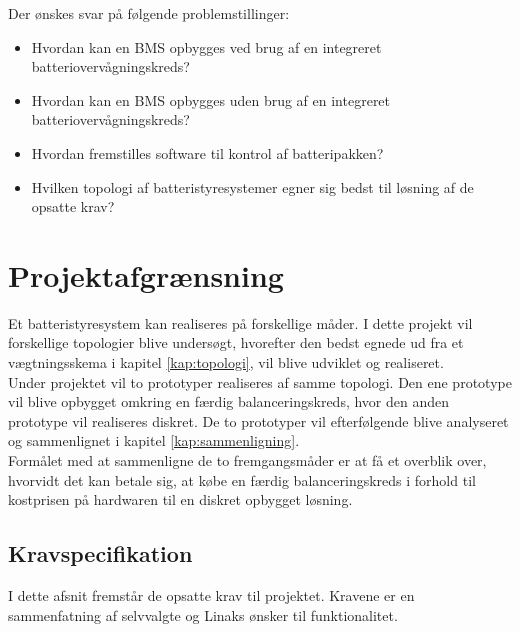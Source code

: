Der ønskes svar på følgende problemstillinger: 

\begin{itemize}[noitemsep]
	\item Hvordan kan en BMS opbygges ved brug af en integreret batteriovervågningskreds?
	\item Hvordan kan en BMS opbygges uden brug af en integreret batteriovervågningskreds? 
	\item Hvordan fremstilles software til kontrol af batteripakken?
	\item Hvilken topologi af batteristyresystemer egner sig bedst til løsning af de opsatte krav?
\end{itemize}

\section{Projektafgrænsning}
Et batteristyresystem kan realiseres på forskellige måder. I dette projekt vil forskellige topologier blive undersøgt, hvorefter den bedst egnede ud fra et vægtningsskema i kapitel \ref{kap:topologi}, vil blive udviklet og realiseret. 
\\

Under projektet vil to prototyper realiseres af samme topologi. Den ene prototype vil blive opbygget omkring en færdig balanceringskreds, hvor den anden prototype vil realiseres diskret. De to prototyper vil efterfølgende blive analyseret og sammenlignet i kapitel \ref{kap:sammenligning}.
\\

Formålet med at sammenligne de to fremgangsmåder er at få et overblik over, hvorvidt det kan betale sig, at købe en færdig balanceringskreds i forhold til kostprisen på hardwaren til en diskret opbygget løsning.


\subsection{Kravspecifikation} \label{afs:kravspecifikation}
I dette afsnit fremstår de opsatte krav til projektet. Kravene er en sammenfatning af selvvalgte og Linaks ønsker til funktionalitet.

